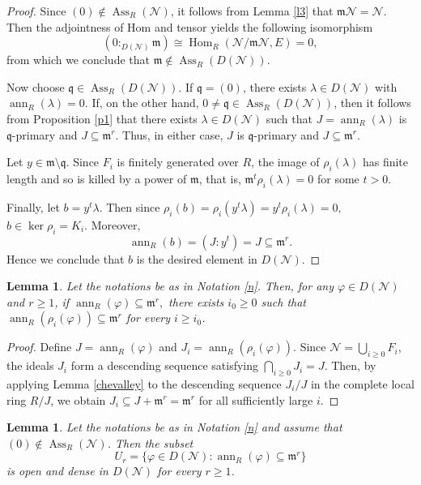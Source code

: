 \documentclass[11pt]{amsart}
\newtheorem{lemma}[theorem]{Lemma}
\theoremstyle{definition}
\newcommand{\m}{\mathfrak m}
\newcommand{\q}{\mathfrak q}
\newcommand{\N}{\mathcal N}
\DeclareMathOperator{\ann}{ann}
\DeclareMathOperator{\Ass}{Ass}
\begin{document}
\begin{proof}
 Since $(0)\notin\Ass_R(\N)$, it follows from Lemma \ref{l3} that $\m\N=\N$. Then the adjointness of Hom and tensor yields the following isomorphism
\[
(0:_{D(\N)}\m)
\cong
\operatorname{Hom}_R(\N/\m\N,E)=0,
\]
from which we conclude that $\m\notin\Ass_R(D(\N)).$

Now choose $\q\in\Ass_R(D(\N))$. If $\q=(0)$, there exists $\lambda\in D(\N)$ with
$\ann_R(\lambda)=0$. If, on the other hand, $0\neq\q\in\Ass_R(D(\N))$, then it follows from Proposition \ref{p1} that there exists $\lambda\in D(\N)$ such that $J=\ann_R(\lambda)$ is $\q$-primary and $J\subseteq\m^r.$ Thus, in either case, $J$ is $\q$-primary and $J\subseteq\m^r$.

Let $y\in\m\setminus\q$. Since $F_i$ is finitely generated over $R$, the image of $\rho_i(\lambda)$ has finite length and so is killed by a power of $\m$, that is, $\mathfrak m^t\rho_i(\lambda)=0$ for some $t>0.$ 

Finally, let $b=y^t\lambda$. Then since $\rho_i(b)=\rho_i(y^t\lambda)=y^t\rho_i(\lambda)=0,$ $b\in \ker \rho_i= K_i$. Moreover, $$\ann_R(b) =(J:y^t)=J\subseteq\m^r.$$ Hence we conclude that $b$ is the desired element in $D(\N)$.
\end{proof}
\begin{lemma}\label{l5} Let the notations be as in Notation \ref{n}. Then, for any $\varphi \in D(\N)$ and $r\geq 1$, if $\ann_R(\varphi)\subseteq\m^r,$  there exists $i_0\geq 0$ such that $\ann_R(\rho_i(\varphi))\subseteq\m^r$ for every $i\geq i_0$.
\end{lemma}
\begin{proof}
Define $J=\ann_R(\varphi)$ and $J_i=\ann_R(\rho_i(\varphi))$. Since $\N=\bigcup_{i\geq 0}F_i$, the ideals $J_i$ form a descending sequence satisfying $\bigcap_{i\geq 0}J_i=J.$ Then,
 by applying Lemma \ref{chevalley} to the descending sequence $J_i/J$ in the complete local ring $R/J$, we obtain $J_i\subseteq J+\m^r =\m^r$ for all sufficiently large $i$.
\end{proof}
\begin{lemma}\label{l6} Let the notations be as in Notation \ref{n} and assume that $(0)\notin\Ass_R(\N)$. Then the subset
\[U_r=\{ \varphi\in D(\N): \ann_R(\varphi)\subseteq\m^r \}
\]
is open and dense in $D(\N)$ for every $r\geq 1$.
\end{lemma}
\end{document}
